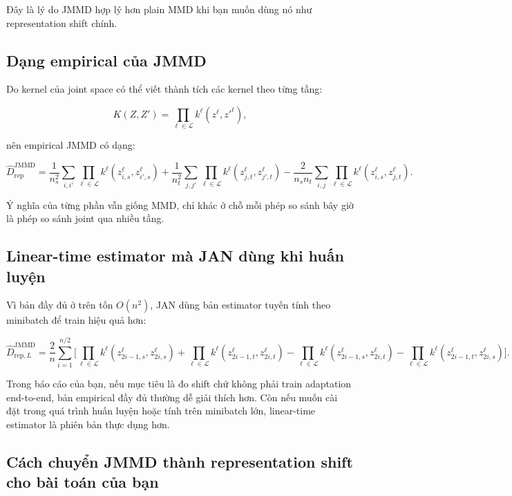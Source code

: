 \documentclass[a4paper]{article}
\begin{document}
Đây là lý do JMMD hợp lý hơn plain MMD khi bạn muốn dùng nó như representation shift chính.

\subsection{Dạng empirical của JMMD}

Do kernel của joint space có thể viết thành tích các kernel theo từng tầng:

\[
K(Z, Z') = \prod_{\ell \in \mathcal L} k^{\ell}(z^{\ell}, z'^{\ell}),
\]

nên empirical JMMD có dạng:

\[
\widehat D_{\mathrm{rep}}^{\mathrm{JMMD}}
=
\frac{1}{n_s^2}\sum_{i,i'}
\prod_{\ell \in \mathcal L} k^{\ell}(z_{i,s}^{\ell}, z_{i',s}^{\ell})
+
\frac{1}{n_t^2}\sum_{j,j'}
\prod_{\ell \in \mathcal L} k^{\ell}(z_{j,t}^{\ell}, z_{j',t}^{\ell})
-
\frac{2}{n_sn_t}\sum_{i,j}
\prod_{\ell \in \mathcal L} k^{\ell}(z_{i,s}^{\ell}, z_{j,t}^{\ell}).
\]

Ý nghĩa của từng phần vẫn giống MMD, chỉ khác ở chỗ mỗi phép so sánh bây giờ là phép so sánh joint qua nhiều tầng.

\subsection{Linear-time estimator mà JAN dùng khi huấn luyện}

Vì bản đầy đủ ở trên tốn $O(n^2)$, JAN dùng bản estimator tuyến tính theo minibatch để train hiệu quả hơn:

\[
\widehat D_{\mathrm{rep},L}^{\mathrm{JMMD}}
=
\frac{2}{n}
\sum_{i=1}^{n/2}
\Big[
\prod_{\ell\in\mathcal L} k^{\ell}(z_{2i-1,s}^{\ell}, z_{2i,s}^{\ell})
+
\prod_{\ell\in\mathcal L} k^{\ell}(z_{2i-1,t}^{\ell}, z_{2i,t}^{\ell})
-
\prod_{\ell\in\mathcal L} k^{\ell}(z_{2i-1,s}^{\ell}, z_{2i,t}^{\ell})
-
\prod_{\ell\in\mathcal L} k^{\ell}(z_{2i-1,t}^{\ell}, z_{2i,s}^{\ell})
\Big].
\]

Trong báo cáo của bạn, nếu mục tiêu là đo shift chứ không phải train adaptation end-to-end, bản empirical đầy đủ thường dễ giải thích hơn. Còn nếu muốn cài đặt trong quá trình huấn luyện hoặc tính trên minibatch lớn, linear-time estimator là phiên bản thực dụng hơn.

\subsection{Cách chuyển JMMD thành representation shift cho bài toán của bạn}
\end{document}
